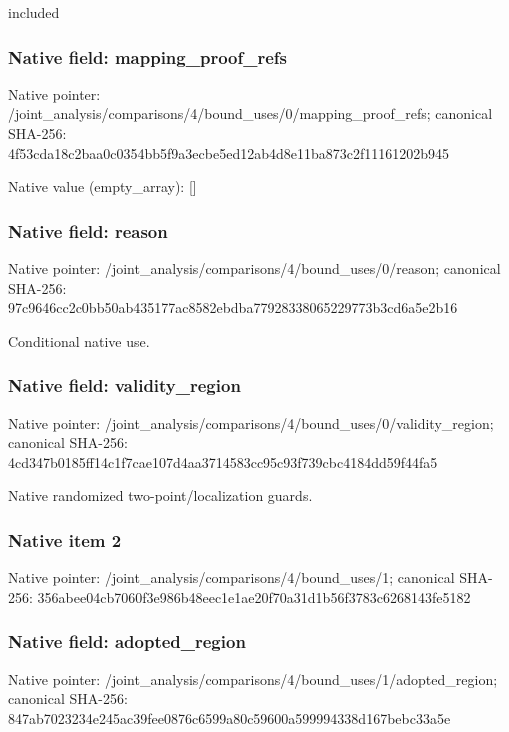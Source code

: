 \documentclass[10pt,a4paper]{article}
\begin{document}
\begingroup\raggedright\sloppy included\par\endgroup

\subsubsection{Native field: mapping\_\allowbreak{}proof\_\allowbreak{}refs}
Native pointer: /joint\_\allowbreak{}analysis/comparisons/4/bound\_\allowbreak{}uses/0/mapping\_\allowbreak{}proof\_\allowbreak{}refs; canonical SHA-256: 4f53cda18c2baa0c0354bb5f9a3ecbe5ed12ab4d8e11ba873c2f11161202b945

Native value (empty\_\allowbreak{}array): []

\subsubsection{Native field: reason}
Native pointer: /joint\_\allowbreak{}analysis/comparisons/4/bound\_\allowbreak{}uses/0/reason; canonical SHA-256: 97c9646cc2c0bb50ab435177ac8582ebdba77928338065229773b3cd6a5e2b16

\begingroup\raggedright\sloppy Conditional native use.\par\endgroup

\subsubsection{Native field: validity\_\allowbreak{}region}
Native pointer: /joint\_\allowbreak{}analysis/comparisons/4/bound\_\allowbreak{}uses/0/validity\_\allowbreak{}region; canonical SHA-256: 4cd347b0185ff14c1f7cae107d4aa3714583cc95c93f739cbc4184dd59f44fa5

\begingroup\raggedright\sloppy Native randomized two-point/\allowbreak{}localization guards.\par\endgroup

\subsubsection{Native item 2}
Native pointer: /joint\_\allowbreak{}analysis/comparisons/4/bound\_\allowbreak{}uses/1; canonical SHA-256: 356abee04cb7060f3e986b48eec1e1ae20f70a31d1b56f3783c6268143fe5182

\subsubsection{Native field: adopted\_\allowbreak{}region}
Native pointer: /joint\_\allowbreak{}analysis/comparisons/4/bound\_\allowbreak{}uses/1/adopted\_\allowbreak{}region; canonical SHA-256: 847ab7023234e245ac39fee0876c6599a80c59600a599994338d167bebc33a5e
\end{document}
